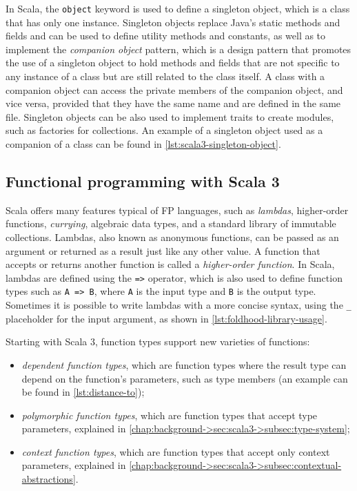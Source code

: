 In Scala, the \texttt{object} keyword is used to define a singleton object, which is a class that has only one instance.
%
Singleton objects replace Java's static methods and fields and can be used to define utility methods and constants, as well as to implement the \textit{companion object} pattern, which is a design pattern that promotes the use of a singleton object to hold methods and fields that are not specific to any instance of a class but are still related to the class itself.
%
A class with a companion object can access the private members of the companion object, and vice versa, provided that they have the same name and are defined in the same file.
%
Singleton objects can be also used to implement traits to create modules, such as factories for collections.
%
An example of a singleton object used as a companion of a class can be found in \cref{lst:scala3-singleton-object}.




\subsection{Functional programming with Scala 3} \label{chap:background->sec:scala3->subsec:functional-programming}

Scala offers many features typical of \ac{FP} languages, such as \textit{lambdas}, higher-order functions, \textit{currying}, algebraic data types, and a standard library of immutable collections.
%
Lambdas, also known as anonymous functions, can be passed as an argument or returned as a result just like any other value.
%
A function that accepts or returns another function is called a \textit{higher-order function}.
%
In Scala, lambdas are defined using the \texttt{=>} operator, which is also used to define function types such as \texttt{A => B}, where \texttt{A} is the input type and \texttt{B} is the output type.
%
Sometimes it is possible to write lambdas with a more concise syntax, using the \texttt{\_} placeholder for the input argument, as shown in \cref{lst:foldhood-library-usage}.

Starting with Scala 3, function types support new varieties of functions:
\begin{itemize}
    \item \textit{dependent function types}, which are function types where the result type can depend on the function's parameters, such as type members (an example can be found in \cref{lst:distance-to});
    \item \textit{polymorphic function types}, which are function types that accept type parameters, explained in \cref{chap:background->sec:scala3->subsec:type-system};
    \item \textit{context function types}, which are function types that accept only context parameters, explained in \cref{chap:background->sec:scala3->subsec:contextual-abstractions}.
\end{itemize}

